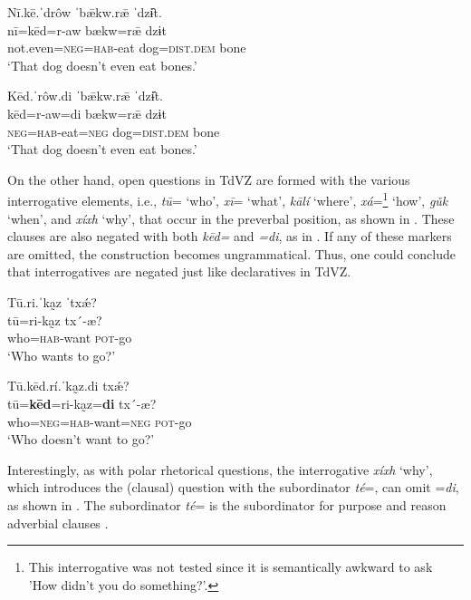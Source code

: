 \documentclass[output=paper,colorlinks=true, citecolor=brown]{langscibook}
\begin{document}
\ea\label{ex:zap:32} 
    \glll Nī.kē.ˈdrôw ˈbǣkw.rǣ ˈdzɨ̂t.\\ 
          nī=kēd=r-aw bækw=rǣ dzɨt\\
          not.even=\textsc{neg}=\textsc{hab}{}-eat dog=\textsc{dist.dem} bone\\
    \glt ‘That dog doesn’t even eat bones.’
\z 

\ea\label{ex:zap:33} 
    \glll Kēd.ˈrôw.di ˈbǣkw.rǣ ˈdzɨ̂t.\\ 
          kēd=r-aw=di bækw=rǣ dzɨt\\
          \textsc{neg}=\textsc{hab}{}-eat\textsc{=neg} dog=\textsc{dist.dem} bone\\
    \glt ‘That dog doesn’t even eat bones.’
\z 

On the other hand, open questions in TdVZ are formed with the various interrogative elements, i.e., \textit{tū}= ‘who’, \textit{xī}= ‘what’, \textit{kālí} ‘where’, \textit{xá}=\footnote{This interrogative was not tested since it is semantically awkward to ask 'How didn’t you do something?'.} ‘how’, \textit{gǔk} ‘when’, and \textit{xíxh} ‘why’, that occur in the preverbal position, as shown in . These clauses are also negated with both \textit{kēd=} and \textit{=di}, as in . If any of these markers are omitted, the construction becomes ungrammatical. Thus, one could conclude that interrogatives are negated just like declaratives in TdVZ.

\ea\label{ex:zap:34} 
    \glll Tū.ri.ˈka̰z ˈtxǽ?\\ 
           tū=ri-ka̰z tx´-æ?\\
           who=\textsc{hab}{}-want \textsc{pot}{}-go\\
    \glt  ‘Who wants to go?'
\z 

\ea\label{ex:zap:35} 
    \glll Tū.kēd.rí.ˈka̰z.di txǽ?\\ 
           tū=\textbf{kēd}=ri-ka̰z=\textbf{di} tx´-æ?\\
           who=\textsc{neg}=\textsc{hab}{}-want=\textsc{neg} \textsc{pot}{}-go\\
    \glt  ‘Who doesn’t want to go?'
\z 

Interestingly, as with polar rhetorical questions, the interrogative \textit{xíxh} ‘why’, which introduces the (clausal) question with the subordinator \textit{té}=, can omit =\textit{di}, as shown in . The subordinator \textit{té}= is the subordinator for purpose and reason adverbial clauses \citep{Gutiérrez2021}.
\end{document}
